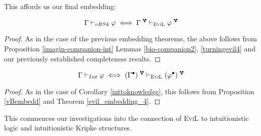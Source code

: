 This affords us our final embedding:

\begin{theorem}\label{evil_embedding_4}
\[ \Gamma \vdash_{vBS4} \phi \iff \Gamma^\radio \vdash_{\textsc{EviL}}\phi^\radio\]
\end{theorem}
\begin{proof}
As in the case of the previous embedding theorems, the above follows
from Proposition \ref{imagin-companion-int} Lemmas
\ref{bio-companion2}, \ref{turningevil4} and our previously established
completeness results.
\end{proof}

\begin{corollary}
\[ \Gamma \vdash_{Int} \phi \iff (\Gamma^\bullet)^\radio \vdash_{\textsc{EviL}}(\phi^\bullet)^\radio\]
\end{corollary}
\begin{proof}
As in the case of Corollary \ref{inttoknowledge}, this follows from Proposition \ref{vBembedd} and Theorem \ref{evil_embedding_4}. 
\end{proof}
This commences our investigations into the connection of \textsc{EviL}
to intuitionistic logic and intuitionistic Kripke structures.



